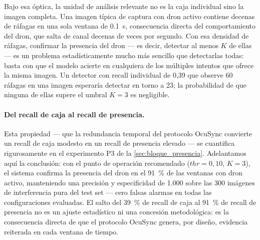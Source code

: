 Bajo esa óptica, la unidad de análisis relevante no es la caja individual sino la imagen completa. Una imagen típica de captura con dron activo contiene decenas de ráfagas en una sola ventana de \SI{0,1}{\second}, consecuencia directa del comportamiento del dron, que salta de canal decenas de veces por segundo. Con esa densidad de ráfagas, confirmar la presencia del dron --- es decir, detectar al menos $K$ de ellas --- es un problema estadísticamente mucho más sencillo que detectarlas todas: basta con que el modelo acierte en cualquiera de los múltiples intentos que ofrece la misma imagen. Un detector con recall individual de 0,39 que observe 60 ráfagas en una imagen esperaría detectar en torno a 23; la probabilidad de que ninguna de ellas supere el umbral $K=3$ es negligible.

\paragraph{Del recall de caja al recall de presencia.}
Esta propiedad --- que la redundancia temporal del protocolo OcuSync convierte un recall de caja modesto en un recall de presencia elevado --- se cuantifica rigurosamente en el experimento P3 de la \cref{sec:bloque_presencia}. Adelantamos aquí la conclusión: con el punto de operación recomendado ($\mathit{thr}=0{,}10$, $K=3$), el sistema confirma la presencia del dron en el \SI{91}{\percent} de las ventanas con dron activo, manteniendo una precisión y especificidad de \num{1,000} sobre las \num{300} imágenes de interferencia pura del test set --- cero falsas alarmas en todas las configuraciones evaluadas. El salto del \SI{39}{\percent} de recall de caja al \SI{91}{\percent} de recall de presencia no es un ajuste estadístico ni una concesión metodológica: es la consecuencia directa de que el protocolo OcuSync genera, por diseño, evidencia reiterada en cada ventana de tiempo.

